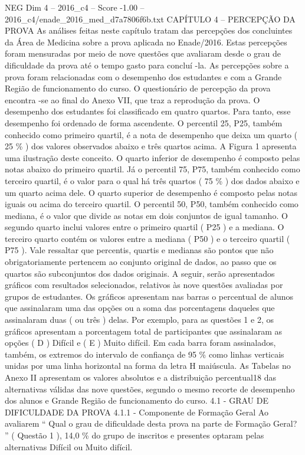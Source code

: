 \begin{textsample}{NEG Dim 4 – 2016\_c4 – Score -1.00 – 2016\_c4/enade\_2016\_med\_d7a7806f6b.txt}  \label{ex:f4_neg_126}
CAPÍTULO 4 – PERCEPÇÃO DA PROVA As análises feitas neste capítulo tratam das percepções dos concluintes da Área de Medicina sobre a prova aplicada no Enade/2016.
Estas percepções foram mensuradas por meio de nove questões que avaliaram desde o grau de dificuldade da prova até o tempo gasto para concluí -la.
As percepções sobre a prova foram relacionadas com o desempenho dos estudantes e com a Grande Região de funcionamento do curso.
O questionário de percepção da prova encontra -se ao final do Anexo VII, que traz a reprodução da prova.
O desempenho dos estudantes foi classificado em quatro quartos.
Para tanto, esse desempenho foi ordenado de forma ascendente.
O percentil 25, P25, também conhecido como primeiro quartil, é a nota de desempenho que deixa um quarto ( 25 \% ) dos valores observados abaixo e três quartos acima.
A Figura 1 apresenta uma ilustração deste conceito.
O quarto inferior de desempenho é composto pelas notas abaixo do primeiro quartil.
Já o percentil 75, P75, também conhecido como terceiro quartil, é o valor para o qual há três quartos ( 75 \% ) dos dados abaixo e um quarto acima dele.
O quarto superior de desempenho é composto pelas notas iguais ou acima do terceiro quartil.
O percentil 50, P50, também conhecido como mediana, é o valor que divide as notas em dois conjuntos de igual tamanho.
O segundo quarto inclui valores entre o primeiro quartil ( P25 ) e a mediana.
O terceiro quarto contém os valores entre a mediana ( P50 ) e o terceiro quartil ( P75 ).
Vale ressaltar que percentis, quartis e medianas são pontos que não obrigatoriamente pertencem ao conjunto original de dados, ao passo que os quartos são subconjuntos dos dados originais.
A seguir, serão apresentados gráficos com resultados selecionados, relativos às nove questões avaliadas por grupos de estudantes.
Os gráficos apresentam nas barras o percentual de alunos que assinalaram uma das opções ou a soma das porcentagens daqueles que assinalaram duas ( ou três ) delas.
Por exemplo, para as questões 1 e 2, os gráficos apresentam a porcentagem total de participantes que assinalaram as opções ( D ) Difícil e ( E ) Muito difícil.
Em cada barra foram assinalados, também, os extremos do intervalo de confiança de 95 \% como linhas verticais unidas por uma linha horizontal na forma da letra H maiúscula.
As Tabelas no Anexo II apresentam os valores absolutos e a distribuição percentual18 das alternativas válidas das nove questões, segundo o mesmo recorte de desempenho dos alunos e Grande Região de funcionamento do curso. 4.1 - GRAU DE DIFICULDADE DA PROVA 4.1.1 - Componente de Formação Geral Ao avaliarem “ Qual o grau de dificuldade desta prova na parte de Formação Geral? ” ( Questão 1 ), 14,0 \% do grupo de inscritos e presentes optaram pelas alternativas Difícil ou Muito difícil.

\end{textsample}

